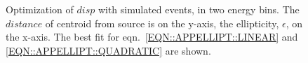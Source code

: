 \begin{figure}[p]
\caption{\label{FIG::APPELLIPT::FITS} Optimization of $disp$ with 
simulated \Gray events, in two energy bins. The $distance$ of centroid
from source is on the y-axis, the ellipticity, $\epsilon$, on the
x-axis. The best fit for eqn.~\ref{EQN::APPELLIPT::LINEAR} and
\ref{EQN::APPELLIPT::QUADRATIC} are shown.}
\end{figure}

